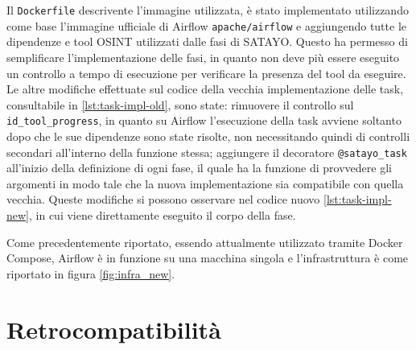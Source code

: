 Il \texttt{Dockerfile} descrivente l'immagine utilizzata, è stato implementato utilizzando
come base l'immagine ufficiale di Airflow \texttt{apache/airflow} e aggiungendo
tutte le dipendenze e tool OSINT utilizzati dalle fasi di SATAYO. Questo ha permesso
di semplificare l'implementazione delle fasi, in quanto non deve più essere
eseguito un controllo a tempo di esecuzione per verificare la presenza del tool
da eseguire. Le altre modifiche effettuate sul codice della vecchia implementazione
delle task, consultabile in \ref{lst:task-impl-old}, sono state: rimuovere il
controllo sul \texttt{id\_tool\_progress}, in quanto su Airflow l'esecuzione
della task avviene soltanto dopo che le sue dipendenze sono state risolte, non necessitando
quindi di controlli secondari all'interno della funzione stessa; aggiungere il
decoratore \texttt{@satayo\_task} all'inizio della definizione di ogni fase, il
quale ha la funzione di provvedere gli argomenti in modo tale che la nuova
implementazione sia compatibile con quella vecchia. Queste modifiche si possono osservare
nel codice nuovo \ref{lst:task-impl-new}, in cui viene direttamente eseguito il
corpo della fase.

Come precedentemente riportato, essendo attualmente utilizzato tramite Docker Compose,
Airflow è in funzione su una macchina singola e l'infrastruttura è come
riportato in figura \ref{fig:infra_new}.

\pagebreak




\section{Retrocompatibilità}
\label{sec:retrocompatibility}

